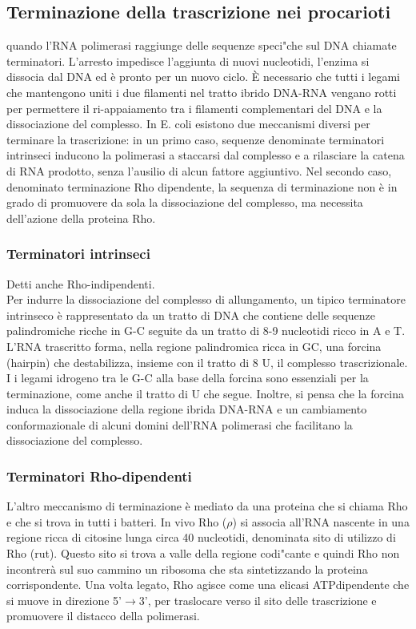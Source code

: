 \documentclass{article}
\begin{document}
\subsection{Terminazione della trascrizione nei procarioti}
quando l'RNA polimerasi raggiunge delle sequenze speci"che sul DNA chiamate terminatori. L'arresto impedisce
l'aggiunta di nuovi nucleotidi, l'enzima si dissocia dal DNA ed è pronto per un
nuovo ciclo. È necessario che tutti i legami che mantengono uniti i due filamenti
nel tratto ibrido DNA-RNA vengano rotti per permettere il ri-appaiamento tra i
filamenti complementari del DNA e la dissociazione del complesso.
In E. coli esistono due meccanismi diversi per terminare la trascrizione: in un
primo caso, sequenze denominate terminatori intrinseci inducono la polimerasi
a staccarsi dal complesso e a rilasciare la catena di RNA prodotto, senza l'ausilio
di alcun fattore aggiuntivo. Nel secondo caso, denominato terminazione Rho dipendente, la sequenza di terminazione non è in grado di promuovere da sola
la dissociazione del complesso, ma necessita dell'azione della proteina Rho.
\subsubsection{Terminatori intrinseci}
Detti anche Rho-indipendenti.\\
Per indurre la dissociazione del complesso di allungamento, un tipico terminatore intrinseco è rappresentato da un tratto di DNA che contiene delle sequenze palindromiche ricche in G-C seguite da un tratto di 8-9 nucleotidi ricco in A
e T. L'RNA trascritto forma, nella regione palindromica ricca in GC, una forcina
(hairpin) che destabilizza, insieme con il tratto di 8 U, il complesso trascrizionale.\\
I i legami idrogeno tra le G-C alla base
della forcina sono essenziali per la terminazione, come anche il tratto di U che segue.
Inoltre, si pensa che la forcina induca la dissociazione della regione ibrida DNA-RNA 
e un cambiamento conformazionale di alcuni domini dell'RNA polimerasi che facilitano la dissociazione del complesso. 
\subsubsection{Terminatori Rho-dipendenti}
L'altro meccanismo di terminazione è mediato da una proteina che si chiama
Rho e che si trova in tutti i batteri. In vivo Rho ($\rho$) si associa all'RNA nascente
in una regione ricca di citosine lunga circa 40 nucleotidi, denominata sito di
utilizzo di Rho (rut). Questo sito si trova a valle della regione codi"cante e
quindi Rho non incontrerà sul suo cammino un ribosoma che sta sintetizzando
la proteina corrispondente. Una volta legato, Rho agisce come una elicasi ATPdipendente che si muove in direzione 5'$\rightarrow$3', per traslocare verso il sito delle
trascrizione e promuovere il distacco della polimerasi.
\end{document}
